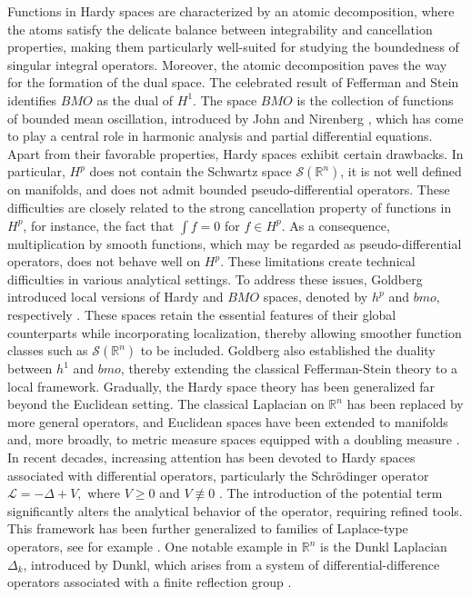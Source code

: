 \documentclass[11pt, reqno]{amsproc}
\theoremstyle{definition}
\theoremstyle{remark}
\numberwithin{equation}{section}
\begin{document}
Functions in Hardy spaces are characterized by an atomic decomposition, where the atoms satisfy the delicate balance between integrability and cancellation properties, making them particularly well-suited for studying the boundedness of singular integral operators. Moreover, the atomic decomposition paves the way for the formation of the dual space. The celebrated result of Fefferman and Stein \cite{Fefferman-1972} identifies $BMO$ as the dual of $H^1$. The space $BMO$ is the collection of functions of bounded mean oscillation, introduced by John and Nirenberg \cite{John-Nirenberg-1961}, which has come to play a central role in harmonic analysis and partial differential equations. Apart from their favorable properties, Hardy spaces exhibit certain drawbacks. In particular, $H^p$ does not contain the Schwartz space $\mathcal{S}(\mathbb{R}^n)$, it is not well defined on manifolds, and does not admit bounded pseudo-differential operators. These difficulties are closely related to the strong cancellation property of functions in $H^p$, for instance, the fact that $\int f = 0$ for $f \in H^p$. As a consequence, multiplication by smooth functions, which may be regarded as pseudo-differential operators, does not behave well on $H^p$. These limitations create technical difficulties in various analytical settings. To address these issues, Goldberg introduced local versions of Hardy and $BMO$ spaces, denoted by $h^p$ and $bmo$, respectively \cite{Goldberg}. These spaces retain the essential features of their global counterparts while incorporating localization, thereby allowing smoother function classes such as $\mathcal{S}(\mathbb{R}^n)$ to be included. Goldberg also established the duality between $h^1$ and $bmo$, thereby extending the classical Fefferman-Stein theory to a local framework. Gradually, the Hardy space theory has been generalized far beyond the Euclidean setting. The classical Laplacian on $\mathbb{R}^n$ has been replaced by more general operators, and Euclidean spaces have been extended to manifolds and, more broadly, to metric measure spaces equipped with a doubling measure \cite{Badr, Lin, Christ}. \\

In recent decades, increasing attention has been devoted to Hardy spaces associated with differential operators, particularly the Schr\"odinger operator $\mathcal{L} = -\Delta + V,$ where $V \geq 0$ and $V \not\equiv 0$ \cite{Dziubanski-1999, Dziubanski-2005, Jacek-2004}. The introduction of the potential term significantly alters the analytical behavior of the operator,  requiring refined tools. This framework has been further generalized to families of Laplace-type operators, see for example \cite{Lin_C}. One notable example in $\mathbb{R}^n$ is the Dunkl Laplacian $\Delta_k$, introduced by Dunkl, which arises from a system of differential-difference operators associated with a finite reflection group \cite{D2}.
\end{document}
